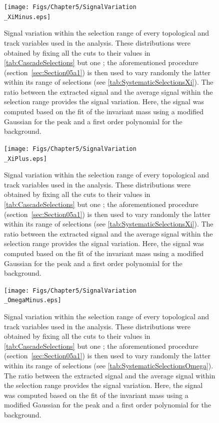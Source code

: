 \begin{landscape}
\begin{figure}[h]
	\centering
	\texttt{[image: Figs/Chapter5/SignalVariation\\\_XiMinus.eps]}
\caption{Signal variation within the selection range of every topological and track variables used in the \rmXiM analysis. These distributions were obtained by fixing all the cuts to their values in \tab\ref{tab:CascadeSelections} but one ; the aforementioned procedure (section~\ref{sec:Section05a1}) is then used to vary randomly the latter within its range of selections (see \tab\ref{tab:SystematicSelectionsXi}). The ratio between the extracted signal and the average signal within the selection range provides the signal variation. Here, the signal was computed based on the fit of the invariant mass using a modified Gaussian for the peak and a first order polynomial for the background.}
	\label{fig:SignalVariation_TopoSel_XiMinus}
\end{figure}

\begin{figure}[h]
	\centering
	\texttt{[image: Figs/Chapter5/SignalVariation\\\_XiPlus.eps]}
\caption{Signal variation within the selection range of every topological and track variables used in the \rmAxiP analysis. These distributions were obtained by fixing all the cuts to their values in \tab\ref{tab:CascadeSelections} but one ; the aforementioned procedure (section~\ref{sec:Section05a1}) is then used to vary randomly the latter within its range of selections (see \tab\ref{tab:SystematicSelectionsXi}). The ratio between the extracted signal and the average signal within the selection range provides the signal variation. Here, the signal was computed based on the fit of the invariant mass using a modified Gaussian for the peak and a first order polynomial for the background.}
	\label{fig:SignalVariation_TopoSel_XiPlus}
\end{figure}

\begin{figure}[h]
	\centering
	\texttt{[image: Figs/Chapter5/SignalVariation\\\_OmegaMinus.eps]}
\caption{Signal variation within the selection range of every topological and track variables used in the \rmOmegaM analysis. These distributions were obtained by fixing all the cuts to their values in \tab\ref{tab:CascadeSelections} but one ; the aforementioned procedure (section~\ref{sec:Section05a1}) is then used to vary randomly the latter within its range of selections (see \tab\ref{tab:SystematicSelectionsOmega}). The ratio between the extracted signal and the average signal within the selection range provides the signal variation. Here, the signal was computed based on the fit of the invariant mass using a modified Gaussian for the peak and a first order polynomial for the background.}
	\label{fig:SignalVariation_TopoSel_OmegaMinus}
\end{figure}


\end{landscape}
